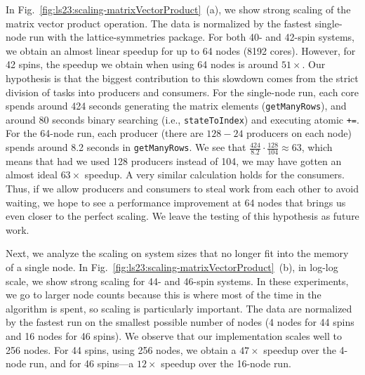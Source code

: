 In Fig.~\ref{fig:ls23:scaling-matrixVectorProduct}~(a), we show strong scaling of the matrix vector product operation. The data is normalized by the fastest single-node run with the lattice-symmetries package. For both 40- and 42-spin systems, we obtain an almost linear speedup for up to 64 nodes (8192 cores). However, for 42 spins, the speedup we obtain when using 64 nodes is around $51\times$. Our hypothesis is that the biggest contribution to this slowdown comes from the strict division of tasks into producers and consumers. For the single-node run, each core spends around 424 seconds generating the matrix elements (\verb|getManyRows|), and around 80 seconds binary searching (i.e., \verb|stateToIndex|) and executing atomic \verb|+=|. For the 64-node run, each producer (there are $128 - 24$ producers on each node) spends around 8.2 seconds in \verb|getManyRows|. We see that $\frac{424}{8.2}\cdot \frac{128}{104} \approx 63$, which means that had we used 128 producers instead of 104, we may have gotten an almost ideal $63\times$ speedup. A very similar calculation holds for the consumers. Thus, if we allow producers and consumers to steal work from each other to avoid waiting, we hope to see a performance improvement at 64 nodes that brings us even closer to the perfect scaling. We leave the testing of this hypothesis as future work.

Next, we analyze the scaling on system sizes that no longer fit into the memory of a single node. In Fig.~\ref{fig:ls23:scaling-matrixVectorProduct}~(b), in log-log scale, we show strong scaling for 44- and 46-spin systems. In these experiments, we go to larger node counts because this is where most of the time in the algorithm is spent, so scaling is particularly important. The data are normalized by the fastest run on the smallest possible number of nodes (4 nodes for 44 spins and 16 nodes for 46 spins). We observe that our implementation scales well to 256 nodes. For 44 spins, using 256 nodes, we obtain a $47 \times$ speedup over the 4-node run, and for 46 spins---a $12\times$ speedup over the 16-node run.


